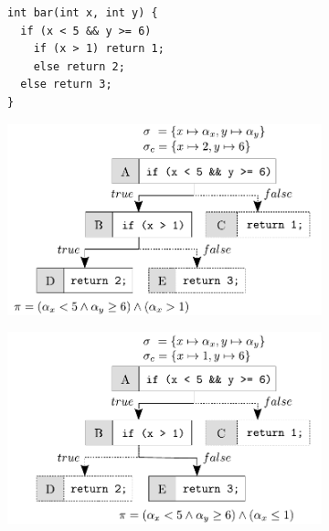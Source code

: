 \begin{figure}[t]
  \begin{subfigure}{.29\textwidth}
    \vspace{5mm}
    \begin{lstlisting}[basicstyle=\ttfamily\scriptsize]
int bar(int x, int y) {
  if (x < 5 && y >= 6) 
    if (x > 1) return 1;
    else return 2;
  else return 3;
}
    \end{lstlisting}
    \vspace{5mm}
    \caption{}
  \end{subfigure}%
  \hspace{-2mm}
  \begin{subfigure}{.37\textwidth}
    \centering
    \includegraphics[width=1.0\columnwidth]{images/concolic-execution} 
    \caption{}
  \end{subfigure}%
  \hspace{-2mm}
  \begin{subfigure}{.33\textwidth}
    \centering
    \vspace{0.05mm}
    \includegraphics[width=1.1\columnwidth]{images/concolic-execution-2} 

\end{subfigure}
\end{figure}
